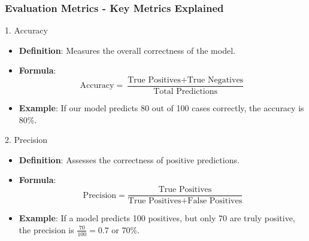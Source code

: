 \documentclass[aspectratio=169]{beamer}
\begin{document}
\begin{frame}[fragile]
    \frametitle{Evaluation Metrics - Key Metrics Explained}
    \begin{block}{1. Accuracy}
        \begin{itemize}
            \item \textbf{Definition}: Measures the overall correctness of the model.
            \item \textbf{Formula}:
            \[
            \text{Accuracy} = \frac{\text{True Positives} + \text{True Negatives}}{\text{Total Predictions}}
            \]
            \item \textbf{Example}: If our model predicts 80 out of 100 cases correctly, the accuracy is 80\%.
        \end{itemize}
    \end{block}
    
    \begin{block}{2. Precision}
        \begin{itemize}
            \item \textbf{Definition}: Assesses the correctness of positive predictions.
            \item \textbf{Formula}:
            \[
            \text{Precision} = \frac{\text{True Positives}}{\text{True Positives} + \text{False Positives}}
            \]
            \item \textbf{Example}: If a model predicts 100 positives, but only 70 are truly positive, the precision is \( \frac{70}{100} = 0.7 \) or 70\%.
        \end{itemize}
    \end{block}
\end{frame}
\end{document}
